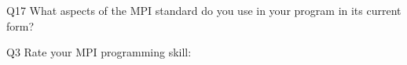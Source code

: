 \begin{description}%
\item{Q17} What aspects of the MPI standard do you use in your program in its current form?%
\item{Q3} Rate your MPI programming skill:%
\end{description}%
